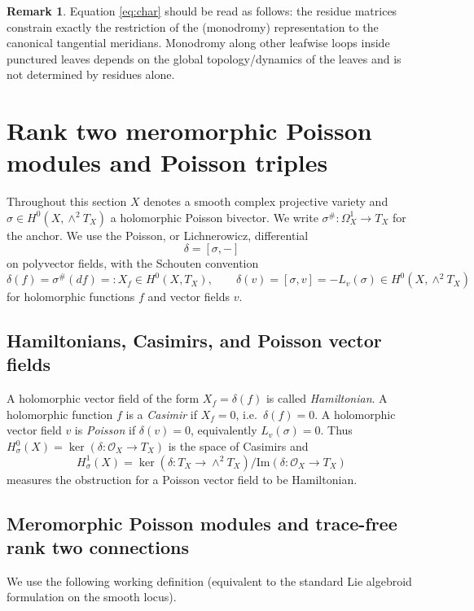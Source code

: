 \documentclass[11pt]{amsart}
\theoremstyle{plain}
\theoremstyle{definition}
\newtheorem{remark}[theorem]{Remark}
\theoremstyle{definition}
\newcommand{\OO}{\mathcal{O}}
\newcommand{\im}{\mathrm{Im}}
\begin{document}
\begin{remark} \label{rem:residues-control}
Equation \eqref{eq:char} should be read as follows: the residue matrices constrain exactly the restriction of the
(monodromy) representation to the canonical tangential meridians. Monodromy along other leafwise loops inside punctured
leaves depends on the global topology/dynamics of the leaves and is not determined by residues alone.
\end{remark}








\section{Rank two meromorphic Poisson modules and Poisson triples}\label{sec:rank2-triples}

Throughout this section $X$ denotes a smooth complex projective variety and
$\sigma\in H^0(X,\wedge^2T_X)$ a holomorphic Poisson bivector. We write
$\sigma^\#: \Omega_X^1\to T_X$ for the anchor. We use the Poisson, or Lichnerowicz,
differential
\[
        \delta=[\sigma,-]
\]
on polyvector fields, with the Schouten convention
\[
\delta(f)=\sigma^\#(df)=:X_f\in H^0(X,T_X),
\qquad
\delta(v)=[\sigma,v]=-L_v(\sigma)\in H^0(X,\wedge^2T_X)
\]
for holomorphic functions $f$ and vector fields $v$.

\subsection{Hamiltonians, Casimirs, and Poisson vector fields}

A holomorphic vector field of the form $X_f=\delta(f)$ is called \emph{Hamiltonian}.
A holomorphic function $f$ is a \emph{Casimir} if $X_f=0$, i.e.\ $\delta(f)=0$.
A holomorphic vector field $v$ is \emph{Poisson} if $\delta(v)=0$, equivalently $L_v(\sigma)=0$.
Thus $H_\sigma^0(X)=\ker(\delta:\OO_X\to T_X)$ is the space of Casimirs and
$$H_\sigma^1(X)=\ker(\delta:T_X\to\wedge^2T_X)/\im(\delta:\OO_X\to T_X)$$ measures the obstruction for a Poisson
vector field to be Hamiltonian.

\subsection{Meromorphic Poisson modules and trace-free rank two connections}

We use the following working definition (equivalent to the standard Lie algebroid formulation on the smooth locus).
\end{document}

